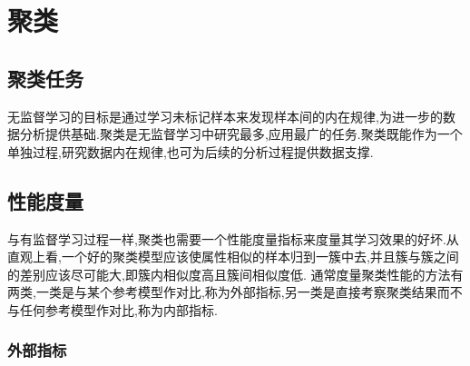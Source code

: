 \chapter{聚类}

\section{聚类任务}

无监督学习的目标是通过学习未标记样本来发现样本间的内在规律,为进一步的数据分析提供基础.聚类是无监督学习中研究最多,应用最广的任务.聚类既能作为一个单独过程,研究数据内在规律,也可为后续的分析过程提供数据支撑.

\section{性能度量}

与有监督学习过程一样,聚类也需要一个性能度量指标来度量其学习效果的好坏.从直观上看,一个好的聚类模型应该使属性相似的样本归到一簇中去,并且簇与簇之间的差别应该尽可能大,即簇内相似度高且簇间相似度低.
通常度量聚类性能的方法有两类,一类是与某个参考模型作对比,称为外部指标,另一类是直接考察聚类结果而不与任何参考模型作对比,称为内部指标.

\subsection*{外部指标}

